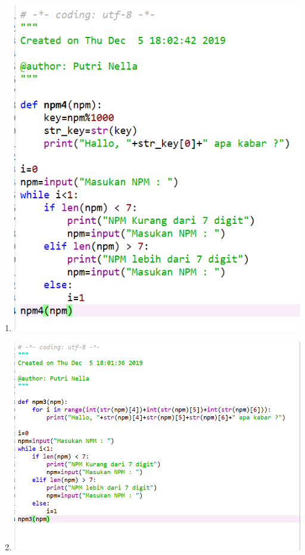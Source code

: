 \documentclass[a4paper, 12pt]{article}
\begin{document}
\begin{enumerate}
\item
\begin{center}
\includegraphics[width=.8\textwidth]{figure/4.PNG}
\end{center}
\item
\begin{center}
\includegraphics[width=.8\textwidth]{figure/3.PNG}
\end{center}	
\end{enumerate}
\item
\end{document}
